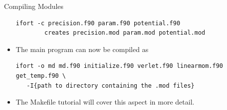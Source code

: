 \documentclass[10pt,t]{beamer}
\begin{document}
\begin{frame}{Compiling Modules}
\begin{itemize}
      \begin{Verbatim}[fontsize=\fontsize{6}{7}\selectfont,formatcom=\color{indigo}]
ifort -c precision.f90 param.f90 potential.f90 
        creates precision.mod param.mod potential.mod
      \end{Verbatim}
    \item The main program can now be compiled as
      \begin{Verbatim}[fontsize=\fontsize{6}{7}\selectfont,formatcom=\color{indigo}]
ifort -o md md.f90 initialize.f90 verlet.f90 linearmom.f90 get_temp.f90 \
   -I{path to directory containing the .mod files}
      \end{Verbatim}
    \item The Makefile tutorial will cover this aspect in more detail.
  \end{itemize}
\end{frame}
\end{document}

